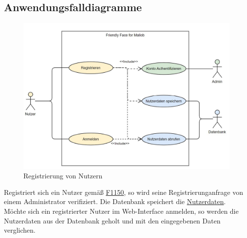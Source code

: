\pagebreak

\subsection{Anwendungsfalldiagramme}

\begin{figure}[H]
    \centering    
    \includegraphics[width=\textwidth]{images-interface/Diagramme/Login_register_3_screenshot.jpg} 
    \caption{Registrierung von \gls{Nutzer}n}
\end{figure}


Registriert sich ein \gls{Nutzer} gemäß \hyperref[FA:API:Registrierung von Nutzern]{F1150}, so wird seine Registrierunganfrage von einem \gls{Administrator} verifiziert. Die \gls{Datenbank} speichert die \hyperref[PD:Nutzerdaten]{Nutzerdaten}.\\
Möchte sich ein registrierter \gls{Nutzer} im \gls{Web-Interface} anmelden, so werden die Nutzerdaten aus der \gls{Datenbank} geholt und mit den eingegebenen Daten verglichen.



